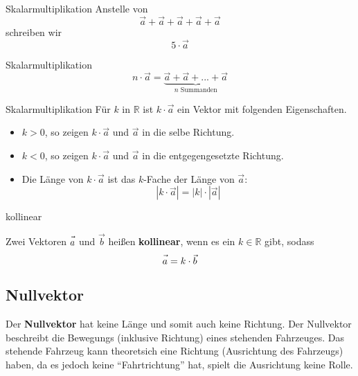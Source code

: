 \begin{beispiel}{Skalarmultiplikation}{}
  Anstelle von
  $$\vec{a}+\vec{a}+\vec{a}+\vec{a}+\vec{a}$$
  schreiben wir
  $$5\cdot{}\vec{a}$$
\end{beispiel}

\begin{definition}{Skalarmultiplikation}{}
  $$n\cdot{}\vec{a} = \underbrace{\vec{a} + \vec{a} + ... + \vec{a}}_{n \textrm{ Summanden}}$$
\end{definition}

\begin{definition}{Skalarmultiplikation}{}
  Für $k$ in $\mathbb{R}$ ist $k\cdot{}\vec{a}$ ein Vektor mit
  folgenden Eigenschaften.

  \begin{itemize}
  \item $k>0$, so zeigen $k\cdot{}\vec{a}$ und $\vec{a}$ in die selbe Richtung.
  \item $k<0$, so zeigen $k\cdot{}\vec{a}$ und $\vec{a}$ in die entgegengesetzte Richtung.
  \item Die Länge von $k\cdot{}\vec{a}$ ist das $k$-Fache der Länge
    von $\vec{a}$: $$|k\cdot{}\vec{a}| = |k|\cdot{}|\vec{a}|$$
   \end{itemize}
\end{definition}

\begin{definition}{kollinear}{}

  Zwei Vektoren $\vec{a\vphantom{b}}$ und $\vec{b}$ heißen \textbf{kollinear}, wenn es ein
  $k\in\mathbb{R}$ gibt, sodass
  $$\vec{a\vphantom{b}} = k\cdot{}\vec{b}$$
  \end{definition}

\newpage


\subsection{Nullvektor}

Der \textbf{Nullvektor} hat keine Länge und somit auch keine
Richtung. Der Nullvektor beschreibt \zB die Bewegungs (inklusive
Richtung) eines stehenden Fahrzeuges.
Das stehende Fahrzeug kann theoretsich eine Richtung (Ausrichtung des
Fahrzeugs) haben, da es jedoch keine ``Fahrtrichtung'' hat, spielt die
Ausrichtung keine Rolle.

\newpage

